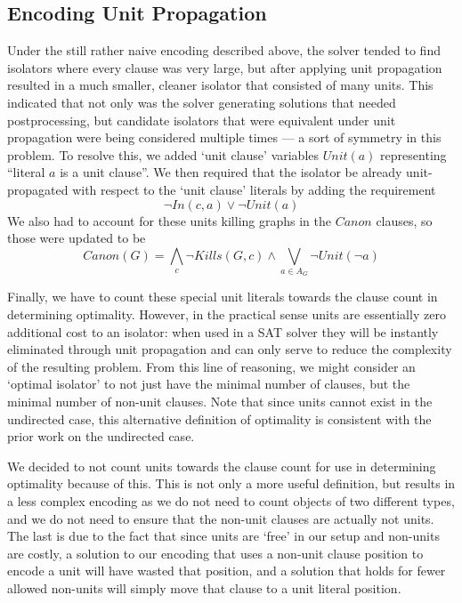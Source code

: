 \documentclass[a4paper,UKenglish,cleveref, autoref, thm-restate]{lipics-v2021}
\begin{document}
\subsection{Encoding Unit Propagation}

Under the still rather naive encoding described above, the solver tended to find isolators where every clause was very large, but after applying unit propagation resulted in a much smaller, cleaner isolator that consisted of many units.  This indicated that not only was the solver generating solutions that needed postprocessing, but candidate isolators that were equivalent under unit propagation were being considered multiple times --- a sort of symmetry in this problem.  To resolve this, we added `unit clause' variables $Unit(a)$ representing ``literal $a$ is a unit clause''. We then required that the isolator be already unit-propagated with respect to the `unit clause' literals by adding the requirement
$$\lnot In(c, a) \lor \lnot Unit(a)$$
We also had to account for these units killing graphs in the $Canon$ clauses, so those were updated to be
$$Canon(G) = \bigwedge\limits_c \lnot Kills(G,c) \land \bigvee\limits_{a \in A_G}\lnot Unit(\lnot a)$$


Finally, we have to count these special unit literals towards the clause count in determining optimality.  However, in the practical sense units are essentially zero additional cost to an isolator: when used in a SAT solver they will be instantly eliminated through unit propagation and can only serve to reduce the complexity of the resulting problem.  From this line of reasoning, we might consider an `optimal isolator' to not just have the minimal number of clauses, but the minimal number of non-unit clauses.  Note that since units cannot exist in the undirected case, this alternative definition of optimality is consistent with the prior work on the undirected case.

We decided to not count units towards the clause count for use in determining optimality because of this.  This is not only a more useful definition, but results in a less complex encoding as we do not need to count objects of two different types, and we do not need to ensure that the non-unit clauses are actually not units.  The last is due to the fact that since units are `free' in our setup and non-units are costly, a solution to our encoding that uses a non-unit clause position to encode a unit will have wasted that position, and a solution that holds for fewer allowed non-units will simply move that clause to a unit literal position.
\end{document}
